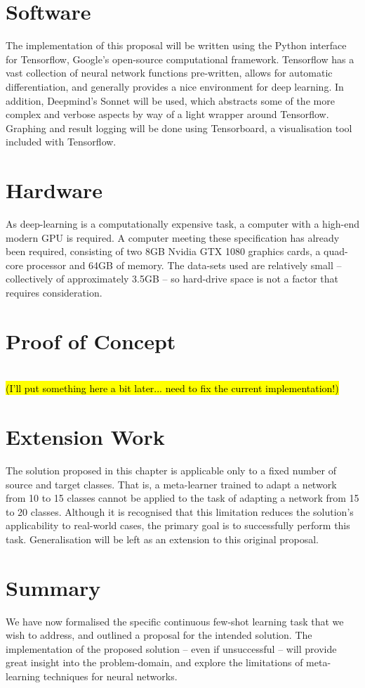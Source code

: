 \documentclass{report}
\newcommand{\TODO}[1]{\sethlcolor{pink}\hl{\\(#1)\\}}
\begin{document}
	
	\section{Software}
	The implementation of this proposal will be written using the Python interface for Tensorflow\parencite{tensorflow}, Google's open-source computational framework. Tensorflow has a vast collection of neural network functions pre-written, allows for automatic differentiation, and generally provides a nice environment for deep learning. In addition, Deepmind's Sonnet\parencite{sonnet} will be used, which abstracts some of the more complex and verbose aspects by way of a light wrapper around Tensorflow. Graphing and result logging will be done using Tensorboard, a visualisation tool included with Tensorflow. \par
	
	\section{Hardware}
	As deep-learning is a computationally expensive task, a computer with a high-end modern GPU is required. A computer meeting these specification has already been required, consisting of two 8GB Nvidia GTX 1080 graphics cards, a quad-core processor and 64GB of memory. The data-sets used are relatively small -- collectively of approximately 3.5GB -- so hard-drive space is not a factor that requires consideration.  \par
	
	\section{Proof of Concept}
	\TODO{I'll put something here a bit later... need to fix the current implementation!}
	
	\section{Extension Work}
	The solution proposed in this chapter is applicable only to a fixed number of source and target classes. That is, a meta-learner trained to adapt a network from 10 to 15 classes cannot be applied to the task of adapting a network from 15 to 20 classes. Although it is recognised that this limitation reduces the solution's applicability to real-world cases, the primary goal is to successfully perform this task. Generalisation will be left as an extension to this original proposal. \par
	
	\section{Summary}	
	We have now formalised the specific continuous few-shot learning task that we wish to address, and outlined a proposal for the intended solution. The implementation of the proposed solution -- even if unsuccessful -- will provide great insight into the problem-domain, and explore the limitations of meta-learning techniques for neural networks.

	\printbibliography
	
	
\end{document}
